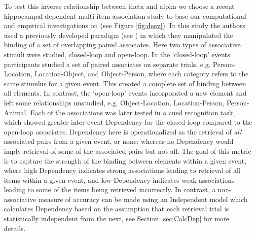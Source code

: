 \documentclass[11pt, titlepage, twoside]{article}
\begin{document}
To test this inverse relationship between theta and alpha we choose a recent hippocampal dependent multi-item association study to base our computational and empirical investigations on \cite{HornerBisbyBushEtAl15} (see Figure \ref{fig:deev}).  In this study the authors used a previously developed paradigm (see \textcite{HornerBurgess13,HornerBurgess14}) in which they manipulated the binding of a set of overlapping paired associates.   Here two types of associative stimuli were studied, closed-loop and open-loop. In the `closed-loop' events participants studied a set of paired associates on separate trials, e.g. Person-Location, Location-Object, and Object-Person, where each category refers to the same stimulus for a given event.  This created a complete set of binding between all elements.   In contrast, the `open-loop' events incorporated a new element and left some relationships unstudied, e.g. Object-Location, Location-Person, Person-Animal.  Each of the associations was later tested in a cued recognition task, which showed greater inter-event Dependency for the closed-loop compared to the open-loop associates.  Dependency here is operationalized as the retrieval of \emph{all} associated pairs from a given event, or none; whereas no Dependency would imply retrieval of some of the associated pairs but not all.  The goal of this metric is to capture the strength of the binding between elements within a given event, where high Dependency indicates strong associations leading to retrieval of all items within a given event, and low Dependency indicates weak associations leading to some of the items being retrieved incorrectly. In contrast, a non-associative measure of accuracy can be made using an Independent model which calculates Dependency based on the assumption that each retrieval trial is statistically independent from the next, see Section \ref{sec:CalcDep} for more details.  %
\end{document}
